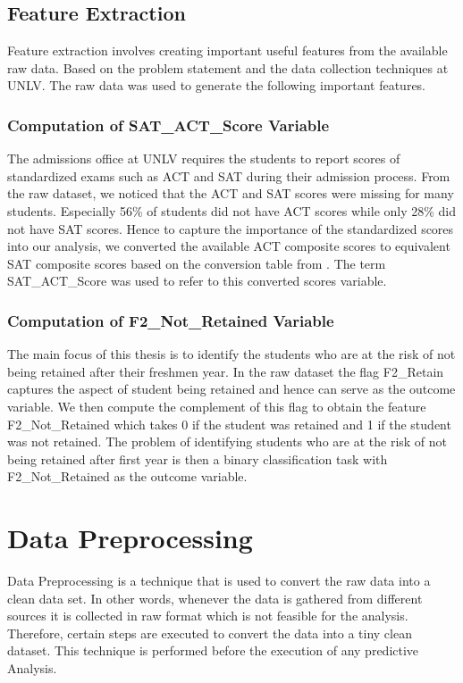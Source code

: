 \documentclass[11pt,openright]{report}
\begin{document}
\subsection{Feature Extraction}
Feature extraction involves creating important useful features from the available raw data. Based on the problem statement and the data collection techniques at UNLV. The raw data was used to generate the following important features.

\subsubsection {Computation of SAT\_ACT\_Score Variable}
The admissions office at UNLV requires the students to report scores of standardized exams such as ACT and SAT during their admission process. From the raw dataset, we noticed that the ACT and SAT scores were missing for many students. Especially 56\% of students did not have ACT scores while only 28\% did not have SAT scores. Hence to capture the importance of the standardized scores into our analysis, we converted the available ACT composite scores to equivalent 
SAT composite scores based on the conversion table from \cite{ACTSAT}. The term SAT\_ACT\_Score was used to refer to this converted scores variable.

\subsubsection {Computation of F2\_Not\_Retained Variable}
The main focus of this thesis is to identify the students who are at the risk of not being retained after their freshmen year. In the raw dataset the flag F2\_Retain captures the aspect of student being retained and hence can serve as the outcome variable. We then compute the complement of this flag to obtain the feature F2\_Not\_Retained which takes 0 if the student was retained and 1 if the student was not retained. The problem of identifying students who are at the risk of not being retained after first year is then a binary classification task with F2\_Not\_Retained as the outcome variable.

\section {Data Preprocessing}
Data Preprocessing is a technique that is used to convert the raw data into a clean data set. In other words, whenever the data is gathered from different sources it is collected in raw format which is not feasible for the analysis.
Therefore, certain steps are executed to convert the data into a tiny clean dataset. This technique is performed before the execution of any predictive Analysis. 
\end{document}

